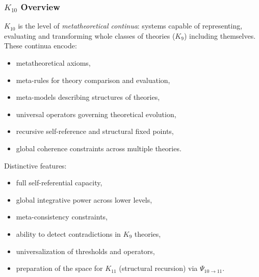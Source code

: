 

\subsubsection{$K_{10}$ Overview}
\label{sec:k10-overview}

$K_{10}$ is the level of \emph{metatheoretical continua}: systems capable of
representing, evaluating and transforming whole classes of theories ($K_9$)
including themselves. These continua encode:
\begin{itemize}
    \item metatheoretical axioms,
    \item meta-rules for theory comparison and evaluation,
    \item meta-models describing structures of theories,
    \item universal operators governing theoretical evolution,
    \item recursive self-reference and structural fixed points,
    \item global coherence constraints across multiple theories.
\end{itemize}

Distinctive features:
\begin{itemize}
    \item full self-referential capacity,
    \item global integrative power across lower levels,
    \item meta-consistency constraints,
    \item ability to detect contradictions in $K_9$ theories,
    \item universalization of thresholds and operators,
    \item preparation of the space for $K_{11}$ (structural recursion) via $\Psi_{10\to11}$.
\end{itemize}

